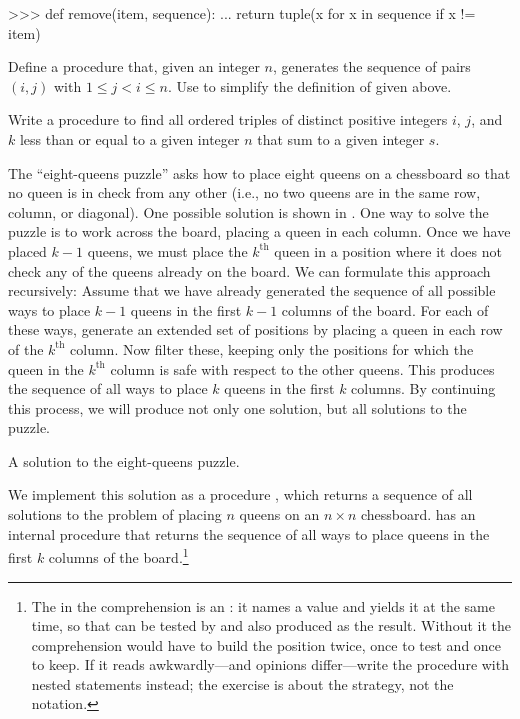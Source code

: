 \begin{codeBlock}
>>> def remove(item, sequence):
...     return tuple(x for x in sequence if x != item)
\end{codeBlock}

\begin{exerciseGroup}
\label{Exercise 2.40}
 Define a procedure
 that, given an integer \( n \), generates the sequence of
pairs \( (i, j) \) with \( 1 \le j < i \le n \).  Use 
to simplify the definition of  given above.

\label{Exercise 2.41}
 Write a procedure to find all
ordered triples of distinct positive integers \( i \), \( j \), and \( k \)
less than or equal to a given integer \( n \) that sum to a given integer \( s
\).

\label{Exercise 2.42}
 The ``eight-queens puzzle'' asks
how to place eight queens on a chessboard so that no queen is in check from any
other (i.e., no two queens are in the same row, column, or diagonal).  One
possible solution is shown in .  One way to solve the puzzle
is to work across the board, placing a queen in each column.  Once we have
placed \( k - 1 \) queens, we must place the \( k^{\mathrm{th}} \) queen in a
position where it does not check any of the queens already on the board.  We
can formulate this approach recursively: Assume that we have already generated
the sequence of all possible ways to place \( k - 1 \) queens in the first \( k
- 1 \) columns of the board.  For each of these ways, generate an extended set
of positions by placing a queen in each row of the \( k^{\mathrm{th}} \)
column.  Now filter these, keeping only the positions for which the queen in
the \( k^{\mathrm{th}} \) column is safe with respect to the other queens.
This produces the sequence of all ways to place \( k \) queens in the first \(
k \) columns.  By continuing this process, we will produce not only one
solution, but all solutions to the puzzle.

\begin{imageFigure}{A solution to the eight-queens puzzle.}
  
\end{imageFigure}

We implement this solution as a procedure , which returns a
sequence of all solutions to the problem of placing \( n \) queens on an
\( n \times n \) chessboard.   has an internal procedure
 that returns the sequence of all ways to place queens in the
first \( k \) columns of the board.\footnote{The \code{:=} in the comprehension
is an : it names a value and yields it at the
same time, so that  can be tested by  and also
produced as the result.  Without it the comprehension would have to build the
position twice, once to test and once to keep.  If it reads awkwardly---and
opinions differ---write the procedure with nested  statements
instead; the exercise is about the strategy, not the notation.}


\end{exerciseGroup}
